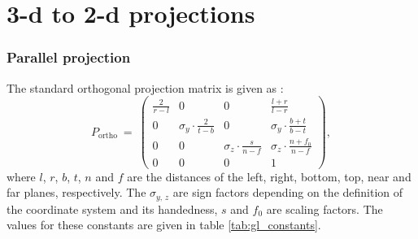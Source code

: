 \section{3-d to 2-d projections}
\label{sec:gl_projs}

\subsubsection{Parallel projection}
The standard orthogonal projection matrix is given as \cite{web_gl_ortho}:
\begin{equation}
	P_{\mathrm{ortho}} \ =\
		\left( \begin{array}{cccc}
			\frac{2}{r-l} &                             0 &                             0 &  \frac{l+r}{l-r}                  \\
			            0 &  \sigma_y \cdot \frac{2}{t-b} &                             0 &  \sigma_y \cdot \frac{b+t}{b-t}   \\
			            0 &                             0 &  \sigma_z \cdot \frac{s}{n-f} &  \sigma_z \cdot \frac{n+f_0}{n-f} \\
			            0 &                             0 &                             0 &  1
		\end{array} \right),
\end{equation}
where $l$, $r$, $b$, $t$, $n$ and $f$ are the distances of the left, right, bottom, top, near and far planes, respectively.
The $\sigma_{y,\, z}$ are sign factors depending on the definition of the coordinate system and its handedness,
$s$ and $f_0$ are scaling factors. The values for these constants are given in table \ref{tab:gl_constants}.



